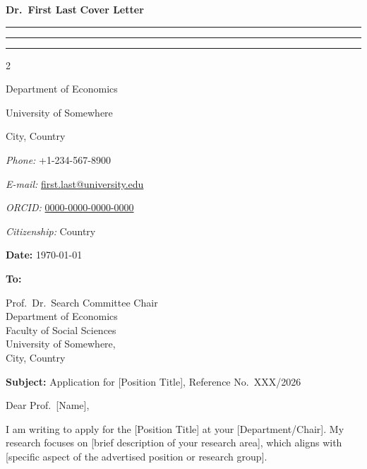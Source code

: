 \documentclass[11pt,english]{article}
\newcommand{\makeheading}[2]%
        {\hspace*{-\marginparsep minus \marginparwidth}%
         \begin{minipage}[t]{\textwidth\marginparwidth\marginparsep}%
         {\LARGE\bfseries #1} \hfill  {\LARGE\bfseries #2 \hspace*{-2.3\marginparsep minus \marginparwidth}}\\[-0.2\baselineskip]%
                 \rule{\textwidth}{1.5pt}\rule{\marginparsep}{1.5pt}\rule{\marginparwidth}{1.5pt}%
         \end{minipage}}
\newcommand{\TARGET}{University of Somewhere}
\begin{document}
\makeheading{Dr.\ First Last}{Cover Letter}


\begin{multicols}{2}

\begin{flushleft}
Department of Economics

University of Somewhere

City, Country

\end{flushleft}


\begin{flushright}
\textit{Phone:} +1-234-567-8900

\textit{E-mail:} \href{mailto:first.last@university.edu}{first.last@university.edu}

\textit{ORCID:} \href{https://orcid.org/0000-0000-0000-0000}{0000-0000-0000-0000}

\textit{Citizenship:} Country

\end{flushright}

\end{multicols}

\vspace{-.15in}

\hfill \textbf{Date:} \today

\vspace{0.15in}

\textbf{To:}

Prof.\ Dr.\ Search Committee Chair \\
Department of Economics \\
Faculty of Social Sciences \\
\TARGET, \\
City, Country

\vspace{0.15in}

\textbf{Subject:} Application for [Position Title], Reference No.\ XXX/2026

\vspace{0.15in}

Dear Prof.\ [Name],

\vspace{0.1in}

I am writing to apply for the [Position Title] at your [Department/Chair]. My research focuses on [brief description of your research area], which aligns with [specific aspect of the advertised position or research group].
\end{document}
